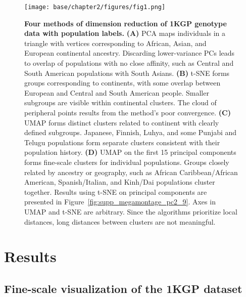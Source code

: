 \clearpage

\begin{figure}[ht]
    \centering
    \texttt{[image: base/chapter2/figures/fig1.png]}
    \caption[Four methods of dimension reduction of 1KGP genotype data]{\textbf{Four methods of dimension reduction of 1KGP genotype data with population labels.} \textbf{(A)} PCA maps individuals in a triangle with vertices corresponding to African, Asian, and European continental ancestry. Discarding lower-variance PCs leads to overlap of populations with no close affinity, such as Central and South American populations with South Asians. \textbf{(B)} t-SNE forms groups corresponding to continents, with some overlap between European and Central and South American people. Smaller subgroups are visible within continental clusters. The cloud of peripheral points results from the method's poor convergence. \textbf{(C)} UMAP forms distinct clusters related to continent with clearly defined subgroups. Japanese, Finnish, Luhya, and some Punjabi and Telugu populations form separate clusters consistent with their population history\citep{10002015global}. \textbf{(D)} UMAP on the first 15 principal components forms fine-scale clusters for individual populations. Groups closely related by ancestry or geography, such as African Caribbean/African American, Spanish/Italian, and Kinh/Dai populations cluster together. Results using t-SNE on principal components are presented in Figure~\ref{fig:supp_megamontage_pc2_9}. Axes in UMAP and t-SNE are arbitrary. Since the algorithms prioritize local distances, long distances between clusters are not meaningful.}
    \label{fig:fig1}
\end{figure}

\clearpage

\section{Results}
\subsection{Fine-scale visualization of the 1KGP dataset}

